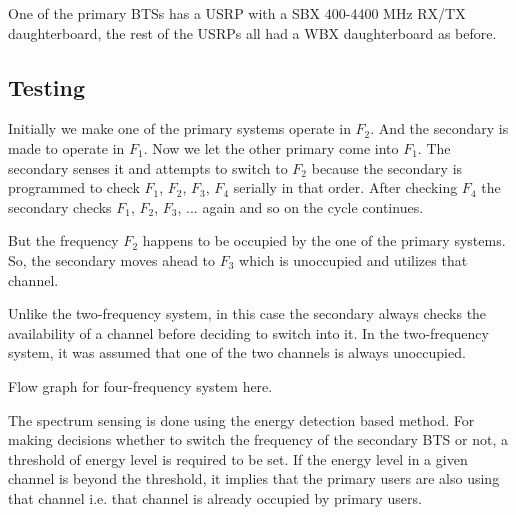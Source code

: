 One of the primary BTSs has a USRP with a SBX 400-4400 MHz RX/TX 
daughterboard, the rest of the USRPs all had a WBX daughterboard as before.

\subsection{Testing}

Initially we make one of the primary systems operate in $F_2$. And the secondary
is made to operate in $F_1$. Now we let the other primary come into $F_1$. The
secondary senses it and attempts to switch to $F_2$ because the secondary is 
programmed to check $F_1$, $F_2$, $F_3$, $F_4$ serially in that order. After checking $F_4$ 
the secondary checks $F_1$, $F_2$, $F_3$, ... again and so on the cycle continues.

But the frequency $F_2$ happens to be occupied by the one of the primary systems.
So, the secondary moves ahead to $F_3$ which is unoccupied and utilizes that 
channel.

Unlike the two-frequency system, in this case the secondary always checks 
the availability of a channel before deciding to switch into it. In the 
two-frequency system, it was assumed that one of the two channels is always
unoccupied.

Flow graph for four-frequency system here.

The spectrum sensing is done using the energy detection based method. For 
making decisions whether to switch the frequency of the secondary BTS or not, 
a threshold of energy level is required to be set. If the energy level in a 
given channel is beyond the threshold, it implies that the primary users are
also using that channel i.e. that channel is already occupied by primary 
users. 





